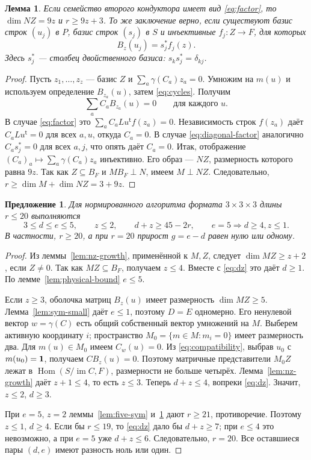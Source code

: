 \documentclass[11pt,a4paper]{article}
\numberwithin{equation}{section}
\theoremstyle{plain}
\newtheorem{lemma}[theorem]{Лемма}
\newtheorem{prop}[theorem]{Предложение}
\theoremstyle{definition}
\DeclareMathOperator{\im}{im}\DeclareMathOperator{\supp}{supp}
\DeclareMathOperator{\Hom}{Hom}\DeclareMathOperator{\diag}{diag}
\newcommand{\leqs}{\leqslant}\newcommand{\geqs}{\geqslant}
\begin{document}
\begin{lemma}\label{lem:injective-product}
Если семейство второго кондуктора имеет вид \eqref{eq:factor}, то
$\dim NZ=9z$ и $r\geqs9z+3$.
То же заключение верно, если существуют базис строк $(u_j)$ в $P$,
базис строк $(s_j)$ в $S$ и инъективные $f_j:Z\to F$, для которых
\begin{equation}\label{eq:diagonal-factor}
 B_z(u_j)=s_j^*f_j(z).
\end{equation}
Здесь $s_j^*$ --- столбец двойственного базиса: $s_k s_j^*=\delta_{kj}$.
\end{lemma}
\begin{proof}
Пусть $z_1,\ldots,z_z$ --- базис $Z$ и
$\sum_a\gamma(C_a)z_a=0$. Умножим на $m(u)$ и используем определение
$B_{z_a}(u)$, затем \eqref{eq:cycles}. Получим
\[
 \sum_a C_a B_{z_a}(u)=0\qquad\text{для каждого }u.
\]
В случае \eqref{eq:factor} это
$\sum_a C_a Lu^{\mathsf t}f(z_a)=0$.
Независимость строк $f(z_a)$ даёт $C_aLu^{\mathsf t}=0$ для всех $a,u$,
откуда $C_a=0$. В случае \eqref{eq:diagonal-factor} аналогично
$C_a s_j^*=0$ для всех $a,j$, что опять даёт $C_a=0$.
Итак, отображение $(C_a)_a\mapsto\sum_a\gamma(C_a)z_a$ инъективно.
Его образ --- $NZ$, размерность которого равна $9z$.
Так как $Z\subseteq B_F$ и $MB_F\perp N$, имеем $M\perp NZ$.
Следовательно, $r\geqs\dim M+\dim NZ=3+9z$.
\end{proof}

\begin{prop}\label{prop:critical}
Для нормированного алгоритма формата $3\times3\times3$ длины $r\leqs20$
выполняются
\[
 3\leqs d\leqs e\leqs5,\qquad z\leqs2,\qquad d+z\geqs45-2r,
 \qquad e=5\Longrightarrow d\geqs4, z\leqs1.
\]
В частности, $r\geqs20$, а при $r=20$ прирост $g=e-d$ равен нулю или одному.
\end{prop}
\begin{proof}
Из леммы~\ref{lem:nz-growth}, применённой к $M,Z$, следует
$\dim MZ\geqs z+2$, если $Z\ne0$. Так как $MZ\subseteq B_F$,
получаем $z\leqs4$. Вместе с \eqref{eq:dz} это даёт $d\geqs1$.
По лемме~\ref{lem:physical-bound} $e\leqs5$.

Если $z\geqs3$, оболочка матриц $B_z(u)$ имеет размерность
$\dim MZ\geqs5$. Лемма~\ref{lem:sym-small} даёт $e\leqs1$,
поэтому $D=E$ одномерно. Его ненулевой вектор $w=\gamma(C)$ есть общий
собственный вектор умножений на $M$. Выберем активную координату $i$;
пространство $M_0=\{m\in M:m_i=0\}$ имеет размерность два.
Для $m(u)\in M_0$ имеем $C_w(u)=0$.
Из \eqref{eq:compatibility}, выбрав $u_0$ с $m(u_0)=\mathbf1$,
получаем $CB_z(u)=0$. Поэтому матричные представители $M_0Z$
лежат в $\Hom(S/\im C,F)$, размерности не больше четырёх.
Лемма~\ref{lem:nz-growth} даёт $z+1\leqs4$, то есть $z\leqs3$.
Теперь $d+z\leqs4$, вопреки \eqref{eq:dz}. Значит, $z\leqs2$, $d\geqs3$.

При $e=5$, $z=2$ леммы~\ref{lem:five-sym} и~\ref{lem:injective-product}
дают $r\geqs21$, противоречие. Поэтому $z\leqs1$, $d\geqs4$.
Если бы $r\leqs19$, то \eqref{eq:dz} дало бы $d+z\geqs7$;
при $e\leqs4$ это невозможно, а при $e=5$ уже $d+z\leqs6$.
Следовательно, $r=20$. Все оставшиеся пары $(d,e)$ имеют разность
ноль или один.
\end{proof}
\end{document}
